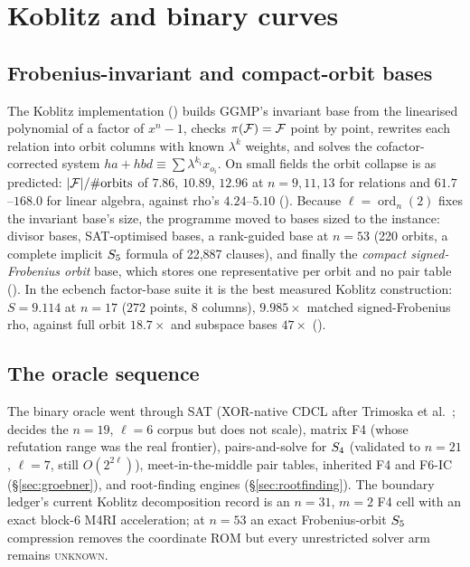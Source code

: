 \section{Koblitz and binary curves}\label{sec:koblitz}

\subsection{Frobenius-invariant and compact-orbit bases}

The Koblitz implementation ()
builds GGMP's invariant base from the linearised polynomial of a factor of
$x^n-1$, checks $\pi(\mathcal{F})=\mathcal{F}$ point by point, rewrites each relation into
orbit columns with known $\lambda^k$ weights, and solves the
cofactor-corrected system $h a+hbd\equiv\sum\lambda^{k_i}x_{o_i}$. On
small fields the orbit collapse is as predicted: $\lvert \mathcal{F} \rvert/\#\text{orbits}$
of $7.86$, $10.89$, $12.96$ at $n=9,11,13$ for relations and
$61.7$--$168.0$ for linear algebra, against rho's $4.24$--$5.10$
(). Because $\ell=\operatorname{ord}_n(2)$
fixes the invariant base's size, the programme moved to bases sized to the
instance: divisor bases, SAT-optimised bases, a rank-guided base at $n=53$
(220 orbits, a complete implicit $S_{5}$ formula of 22{,}887 clauses), and
finally the \emph{compact signed-Frobenius orbit} base, which stores one
representative per orbit and no pair table
(). In the ecbench factor-base
suite it is the best measured Koblitz construction: $S=9.114$ at $n=17$
($272$ points, 8 columns), $9.985\times$ matched signed-Frobenius rho,
against full orbit $18.7\times$ and subspace bases $47\times$
().

\subsection{The oracle sequence}

The binary oracle went through SAT (XOR-native CDCL after Trimoska et
al.~\cite{trimoska2020}; decides the $n=19$, $\ell=6$ corpus but does not
scale), matrix F4 (whose refutation range was the real frontier),
pairs-and-solve for $S_{4}$ (validated to $n=21$, $\ell=7$, still
$O(2^{2\ell})$), meet-in-the-middle pair tables, inherited F4 and F6-IC
(\S\ref{sec:groebner}), and root-finding engines (\S\ref{sec:rootfinding}).
The boundary ledger's current Koblitz decomposition record is an $n=31$,
$m=2$ F4 cell with an exact block-6 M4RI acceleration; at $n=53$ an exact
Frobenius-orbit $S_{5}$ compression removes the coordinate ROM but every
unrestricted solver arm remains \textsc{unknown}.

